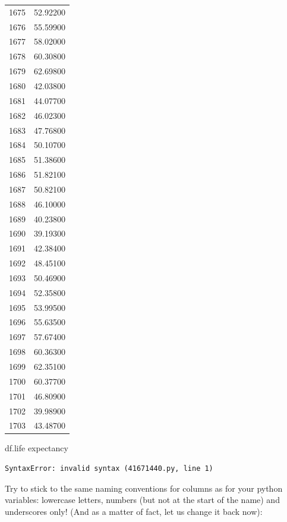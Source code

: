 \documentclass[
  letterpaper,
  DIV=11,
  numbers=noendperiod]{scrreprt}
\newenvironment{Shaded}{\begin{snugshade}}{\end{snugshade}}
\newcommand{\NormalTok}[1]{\textcolor[rgb]{0.00,0.23,0.31}{#1}}
\begin{document}
\begin{tcolorbox}
\begin{tabular}{lr}
1675 &         52.92200 \\
1676 &         55.59900 \\
1677 &         58.02000 \\
1678 &         60.30800 \\
1679 &         62.69800 \\
1680 &         42.03800 \\
1681 &         44.07700 \\
1682 &         46.02300 \\
1683 &         47.76800 \\
1684 &         50.10700 \\
1685 &         51.38600 \\
1686 &         51.82100 \\
1687 &         50.82100 \\
1688 &         46.10000 \\
1689 &         40.23800 \\
1690 &         39.19300 \\
1691 &         42.38400 \\
1692 &         48.45100 \\
1693 &         50.46900 \\
1694 &         52.35800 \\
1695 &         53.99500 \\
1696 &         55.63500 \\
1697 &         57.67400 \\
1698 &         60.36300 \\
1699 &         62.35100 \\
1700 &         60.37700 \\
1701 &         46.80900 \\
1702 &         39.98900 \\
1703 &         43.48700 \\
\bottomrule
\end{tabular}

\begin{Shaded}
\begin{Highlighting}[]
\NormalTok{df.life expectancy}
\end{Highlighting}
\end{Shaded}

\begin{verbatim}
SyntaxError: invalid syntax (41671440.py, line 1)
\end{verbatim}

Try to stick to the same naming conventions for columns as for your
python variables: lowercase letters, numbers (but not at the start of
the name) and underscores only! (And as a matter of fact, let us change
it back now):


\end{tcolorbox}
\end{document}
